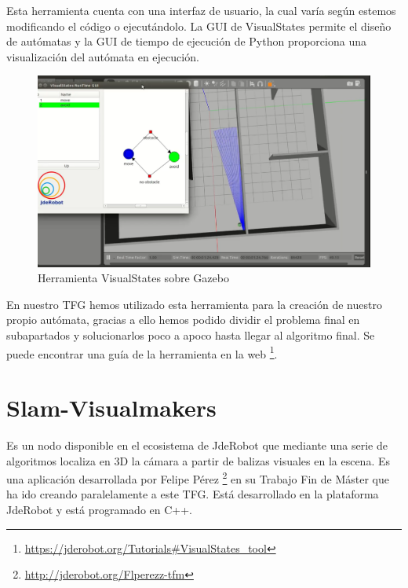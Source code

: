 \hspace{1cm} Esta herramienta cuenta con una interfaz de usuario, la cual varía según estemos modificando el código o ejecutándolo. La GUI de VisualStates permite el diseño de autómatas y la GUI de tiempo de ejecución de Python proporciona una visualización del autómata en ejecución. 
\\

\begin{figure}[H]
	\begin{center}
		\includegraphics[width=1\textwidth]{imag/IMG19.png}
				\caption{Herramienta VisualStates sobre Gazebo} 
	\label{fig:Visual States.}	
	\end{center}
\end{figure}

\hspace{1cm} En nuestro TFG hemos utilizado esta herramienta para la creación de nuestro propio autómata, gracias a ello hemos podido dividir el problema final en subapartados y solucionarlos poco a apoco hasta llegar al algoritmo final. Se puede encontrar una guía de la herramienta en la web \footnote{\url{https://jderobot.org/Tutorials\#VisualStates_tool}}.

\section{Slam-Visualmakers}
\hspace{1cm} Es un nodo disponible en el ecosistema de JdeRobot que mediante una serie de algoritmos localiza en 3D la cámara a partir de balizas visuales en la escena. Es una aplicación desarrollada por Felipe Pérez \footnote{\url{http://jderobot.org/Flperezz-tfm}} en su Trabajo Fin de Máster que ha ido creando paralelamente a este TFG. Está desarrollado en la plataforma JdeRobot y está programado en C++. 


